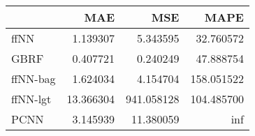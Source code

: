\begin{tabular}{lrrr}
\toprule
{} &        MAE &         MSE &        MAPE \\
\midrule
ffNN     &   1.139307 &    5.343595 &   32.760572 \\
GBRF     &   0.407721 &    0.240249 &   47.888754 \\
ffNN-bag &   1.624034 &    4.154704 &  158.051522 \\
ffNN-lgt &  13.366304 &  941.058128 &  104.485700 \\
PCNN     &   3.145939 &   11.380059 &         inf \\
\bottomrule
\end{tabular}
